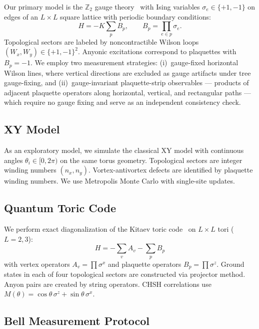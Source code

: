 \documentclass[aps,pra,twocolumn,superscriptaddress,showpacs,floatfix]{revtex4-2}
\newcommand{\Ztwo}{\mathbb{Z}_2}
\begin{document}
Our primary model is the $\Ztwo$ gauge theory~\cite{Wegner1971} with Ising
variables $\sigma_e \in \{+1,-1\}$ on edges of an $L \times L$ square lattice
with periodic boundary conditions:
\begin{equation}
  H = -K \sum_p B_p, \qquad B_p = \prod_{e \in p} \sigma_e.
  \label{eq:z2_hamiltonian}
\end{equation}
Topological sectors are labeled by noncontractible Wilson loops
$(W_x, W_y) \in \{+1,-1\}^2$. Anyonic excitations correspond to plaquettes with
$B_p = -1$. We employ two measurement strategies: (i)~gauge-fixed horizontal
Wilson lines, where vertical directions are excluded as gauge artifacts under tree
gauge-fixing, and (ii)~gauge-invariant plaquette-strip observables --- products of
adjacent plaquette operators along horizontal, vertical, and rectangular paths ---
which require no gauge fixing and serve as an independent consistency check.

\subsection{XY Model}

As an exploratory model, we simulate the classical XY model with continuous angles
$\theta_i \in [0, 2\pi)$ on the same torus geometry. Topological sectors are
integer winding numbers $(n_x, n_y)$. Vortex-antivortex defects are identified by
plaquette winding numbers. We use Metropolis Monte Carlo with single-site updates.

\subsection{Quantum Toric Code}

We perform exact diagonalization of the Kitaev toric code~\cite{Kitaev2003} on
$L \times L$ tori ($L = 2, 3$):
\begin{equation}
  H = -\sum_v A_v - \sum_p B_p
  \label{eq:toric_code}
\end{equation}
with vertex operators $A_v = \prod \sigma^x$ and plaquette operators
$B_p = \prod \sigma^z$. Ground states in each of four topological sectors are
constructed via projector method. Anyon pairs are created by string operators.
CHSH correlations use
$M(\theta) = \cos\theta\,\sigma^z + \sin\theta\,\sigma^x$.

\subsection{Bell Measurement Protocol}
\end{document}
